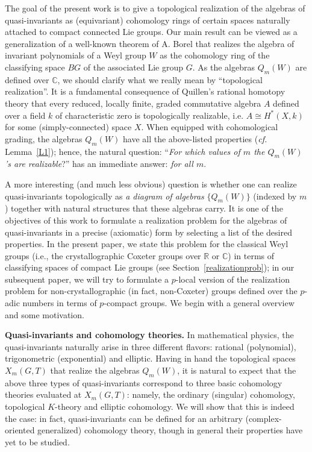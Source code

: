 \documentclass[11pt]{amsart}
\theoremstyle{definition}
\theoremstyle{remark}
\numberwithin{equation}{section}
\def\C{\mathbb C}
\begin{document}
The goal of the present work is to give a topological realization of the algebras of quasi-invariants as (equivariant) cohomology rings of certain spaces naturally attached to compact connected Lie groups. Our main result can be viewed as a generalization of a well-known theorem of A. Borel \cite{Bo53}  that realizes the algebra of invariant polynomials of a Weyl group $ W $ as the cohomology ring of the classifying space $BG$ of the associated Lie group $G$. As the algebras $Q_m(W)$ are defined over $\C$, we should clarify what we really mean by ``topological realization''. It is a fundamental consequence of Quillen's rational homotopy theory \cite{Qui69} that every reduced, locally finite, graded commutative algebra $A$ defined over a field $k$ of characteristic zero is topologically realizable, i.e. $ A \cong H^*(X, k) $ for some (simply-connected) space $X$. When equipped with cohomological grading, the algebras $Q_m(W)$ have all the above-listed properties ({\it cf.} Lemma~\ref{L1}); hence, the natural question: ``{\it For which values of $m$ the $ Q_m(W)$'s are realizable}?'' has an immediate answer: {\it for all $m$}. 

A more interesting (and much less obvious) question is whether one can realize quasi-invariants
topologically as {\it a diagram of algebras} $ \{Q_m(W)\} $ (indexed by $m$) together with  natural structures that these algebras carry. It is one of the objectives of this work to formulate a realization problem for the algebras of 
quasi-invariants in a precise (axiomatic) form by selecting a list of the desired properties.
In the present paper, we state this problem for the classical Weyl groups (i.e., the crystallographic Coxeter groups over  $\mathbb{R}$ or $\C$) in terms of classifying spaces of compact Lie groups (see Section~\ref{realizationprob}); in our subsequent paper, we will try to formulate a $p$-local version of the realization problem for non-crystallographic (in fact, non-Coxeter) groups defined over the $p$-adic numbers in terms of $p$-compact groups.
We begin with a general overview and some motivation.

\vspace*{1ex}

\noindent
{\bf Quasi-invariants and cohomology theories.} 
In mathematical physics, the quasi-invariants naturally arise in three different flavors: rational (polynomial), trigonometric (exponential) and elliptic. Having in hand the topological spaces $ X_m(G,T)$ that realize the algebras $Q_m(W)$, it is natural to expect that the above three types of quasi-invariants correspond to three basic cohomology theories evaluated at $ X_m(G,T) $: namely, the ordinary (singular) cohomology, topological $K$-theory and elliptic cohomology. We will show that this is indeed the case: in fact, quasi-invariants can be defined for an arbitrary (complex-oriented generalized) cohomology theory, though in general their properties have yet to be studied.
\end{document}
